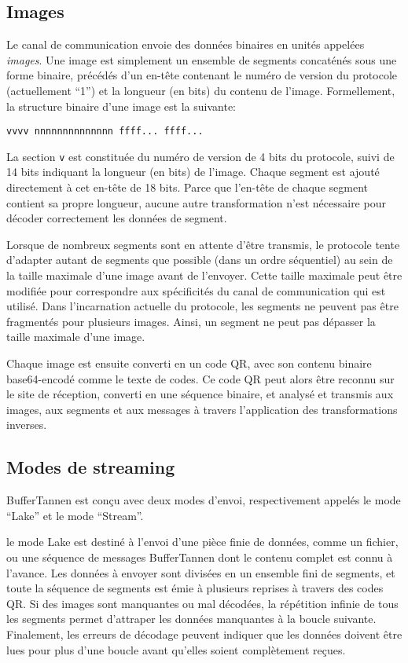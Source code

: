 \subsection{Images}
\setcounter{paragraph}{0}

Le canal de communication envoie des données binaires en unités appelées \emph{images}. Une image est simplement un ensemble de segments concaténés sous une forme binaire, précédés d'un en-tête contenant le numéro de version du protocole (actuellement ``1'') et la longueur (en bits) du contenu de l'image. Formellement, la structure binaire d'une image est la suivante:

\begin{verbatim}
vvvv nnnnnnnnnnnnnn ffff... ffff...
\end{verbatim}

La section \verb+v+ est constituée du numéro de version de 4 bits du protocole, suivi de 14 bits indiquant la longueur (en bits) de l'image. Chaque segment est ajouté directement à cet en-tête de 18 bits. Parce que l'en-tête de chaque segment contient sa propre longueur, aucune autre transformation n'est nécessaire pour décoder correctement les données de segment.

Lorsque de nombreux segments sont en attente d'être transmis, le protocole tente d'adapter autant de segments que possible (dans un ordre séquentiel) au sein de la taille maximale d'une image avant de l'envoyer. Cette taille maximale peut être modifiée pour correspondre aux spécificités du canal de communication qui est utilisé. Dans l'incarnation actuelle du protocole, les segments ne peuvent pas être fragmentés pour plusieurs images. Ainsi, un segment ne peut pas dépasser la taille maximale d'une image.

Chaque image est ensuite converti en un code QR, avec son contenu binaire base64-encodé comme le texte de codes. Ce code QR peut alors être reconnu sur le site de réception, converti en une séquence binaire, et analysé et transmis aux images, aux segments et aux messages à travers l'application des transformations inverses.

\subsection{Modes de streaming}
\setcounter{paragraph}{0}

BufferTannen est conçu avec deux modes d'envoi, respectivement appelés le mode ``Lake'' et le mode ``Stream''.

le mode Lake est destiné à l'envoi d'une pièce finie de données, comme un fichier, ou une séquence de messages BufferTannen dont le contenu complet est connu à l'avance. Les données à envoyer sont divisées en un ensemble fini de segments, et toute la séquence de segments est émie à plusieurs reprises à travers des codes QR. Si des images sont manquantes ou mal décodées, la répétition infinie de tous les segments permet d'attraper les données manquantes à la boucle suivante. Finalement, les erreurs de décodage peuvent indiquer que les données doivent être lues pour plus d'une boucle avant qu'elles soient complètement reçues.

